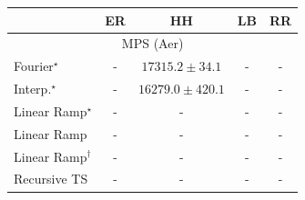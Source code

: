 \begin{tabular}{l|cccc|}
\toprule
            & ER & HH & LB & RR \\
\midrule
\multicolumn{5}{c}{\rule{0pt}{8pt}MPS (Aer)} \\
\midrule
Fourier$^\star$ & {\cellcolor[HTML]{000000}} \color[HTML]{F1F1F1} {\cellcolor{white}} \color{black} - & {\cellcolor[HTML]{4D004B}} \color[HTML]{F1F1F1} $17315.2\pm 34.1$ & {\cellcolor[HTML]{000000}} \color[HTML]{F1F1F1} {\cellcolor{white}} \color{black} - & {\cellcolor[HTML]{000000}} \color[HTML]{F1F1F1} {\cellcolor{white}} \color{black} - \\
Interp.$^\star$ & {\cellcolor[HTML]{000000}} \color[HTML]{F1F1F1} {\cellcolor{white}} \color{black} - & {\cellcolor[HTML]{F7FCFD}} \color[HTML]{000000} $16279.0\pm 420.1$ & {\cellcolor[HTML]{000000}} \color[HTML]{F1F1F1} {\cellcolor{white}} \color{black} - & {\cellcolor[HTML]{000000}} \color[HTML]{F1F1F1} {\cellcolor{white}} \color{black} - \\
Linear Ramp$^\star$ & {\cellcolor[HTML]{000000}} \color[HTML]{F1F1F1} {\cellcolor{white}} \color{black} - & {\cellcolor[HTML]{000000}} \color[HTML]{F1F1F1} {\cellcolor{white}} \color{black} - & {\cellcolor[HTML]{000000}} \color[HTML]{F1F1F1} {\cellcolor{white}} \color{black} - & {\cellcolor[HTML]{000000}} \color[HTML]{F1F1F1} {\cellcolor{white}} \color{black} - \\
Linear Ramp & {\cellcolor[HTML]{000000}} \color[HTML]{F1F1F1} {\cellcolor{white}} \color{black} - & {\cellcolor[HTML]{000000}} \color[HTML]{F1F1F1} {\cellcolor{white}} \color{black} - & {\cellcolor[HTML]{000000}} \color[HTML]{F1F1F1} {\cellcolor{white}} \color{black} - & {\cellcolor[HTML]{000000}} \color[HTML]{F1F1F1} {\cellcolor{white}} \color{black} - \\
Linear Ramp$^\dagger$ & {\cellcolor[HTML]{000000}} \color[HTML]{F1F1F1} {\cellcolor{white}} \color{black} - & {\cellcolor[HTML]{000000}} \color[HTML]{F1F1F1} {\cellcolor{white}} \color{black} - & {\cellcolor[HTML]{000000}} \color[HTML]{F1F1F1} {\cellcolor{white}} \color{black} - & {\cellcolor[HTML]{000000}} \color[HTML]{F1F1F1} {\cellcolor{white}} \color{black} - \\
Recursive TS & {\cellcolor[HTML]{000000}} \color[HTML]{F1F1F1} {\cellcolor{white}} \color{black} - & {\cellcolor[HTML]{000000}} \color[HTML]{F1F1F1} {\cellcolor{white}} \color{black} - & {\cellcolor[HTML]{000000}} \color[HTML]{F1F1F1} {\cellcolor{white}} \color{black} - & {\cellcolor[HTML]{000000}} \color[HTML]{F1F1F1} {\cellcolor{white}} \color{black} - \\

\end{tabular}
